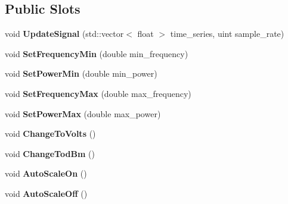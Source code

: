 \subsection*{Public Slots}
\begin{DoxyCompactItemize}
\item 
void {\bfseries Update\+Signal} (std\+::vector$<$ float $>$ time\+\_\+series, uint sample\+\_\+rate)\hypertarget{class_spectrum_analyzer_aa1979b784bdb752d6f635c4cecb9a4b6}{}\label{class_spectrum_analyzer_aa1979b784bdb752d6f635c4cecb9a4b6}

\item 
void {\bfseries Set\+Frequency\+Min} (double min\+\_\+frequency)\hypertarget{class_spectrum_analyzer_a442e34f2e52a974bc33d614c4714a9e3}{}\label{class_spectrum_analyzer_a442e34f2e52a974bc33d614c4714a9e3}

\item 
void {\bfseries Set\+Power\+Min} (double min\+\_\+power)\hypertarget{class_spectrum_analyzer_aeb522d65cc87a8491f2480b3ec1cf133}{}\label{class_spectrum_analyzer_aeb522d65cc87a8491f2480b3ec1cf133}

\item 
void {\bfseries Set\+Frequency\+Max} (double max\+\_\+frequency)\hypertarget{class_spectrum_analyzer_ad1d9bf78ce633b097641ee092645daae}{}\label{class_spectrum_analyzer_ad1d9bf78ce633b097641ee092645daae}

\item 
void {\bfseries Set\+Power\+Max} (double max\+\_\+power)\hypertarget{class_spectrum_analyzer_adcaf09fb5f0449b6dd95b97e2469af47}{}\label{class_spectrum_analyzer_adcaf09fb5f0449b6dd95b97e2469af47}

\item 
void {\bfseries Change\+To\+Volts} ()\hypertarget{class_spectrum_analyzer_a7edc26864d46ebddd34257ff0d6bc8b7}{}\label{class_spectrum_analyzer_a7edc26864d46ebddd34257ff0d6bc8b7}

\item 
void {\bfseries Change\+Tod\+Bm} ()\hypertarget{class_spectrum_analyzer_af8f497cd56535515bc17319236fb0524}{}\label{class_spectrum_analyzer_af8f497cd56535515bc17319236fb0524}

\item 
void {\bfseries Auto\+Scale\+On} ()\hypertarget{class_spectrum_analyzer_a5370e5bdbd0ada33968251465658fd08}{}\label{class_spectrum_analyzer_a5370e5bdbd0ada33968251465658fd08}

\item 
void {\bfseries Auto\+Scale\+Off} ()\hypertarget{class_spectrum_analyzer_a033bdac1dd490537ab6ead20059b8c6e}{}\label{class_spectrum_analyzer_a033bdac1dd490537ab6ead20059b8c6e}

\end{DoxyCompactItemize}
